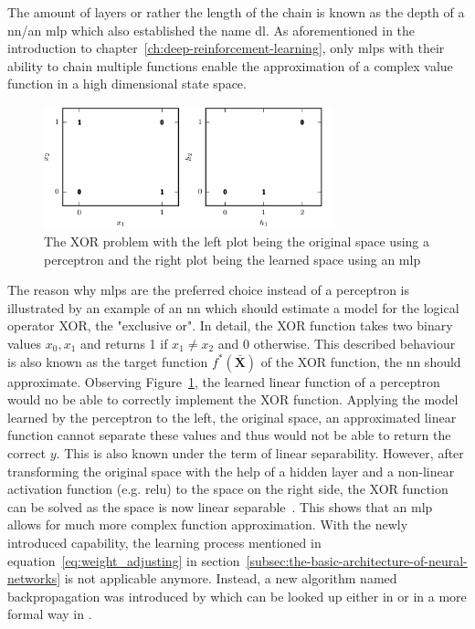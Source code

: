 \documentclass[draft,final]{vutinfth} %
\newcommand{\p}[1]{see p. #1}
\begin{document}
    The amount of layers or rather the length of the chain is known as the depth of a \gls{nn}/an \gls{mlp} which also established the name \acrlong{dl}.
    As aforementioned in the introduction to chapter~\ref{ch:deep-reinforcement-learning}, only \glspl{mlp} with their ability to chain multiple functions enable the approximation of a complex value function in a high dimensional state space.

    \begin{figure}[h]
        \vspace{0.5cm}
        \centering
        \includegraphics[width=0.75\textwidth]{figures/xor_problem.png}
        \caption[The XOR problem]{The XOR problem with the left plot being the original space using a perceptron and the right plot being the learned space using an \gls{mlp}\protect\footnotemark}
        \label{fig:xor_problem}
    \end{figure}

    \footnotetext{\cite[\p{168}]{goodfellow_deep_2016}}
    The reason why \glspl{mlp} are the preferred choice instead of a perceptron is illustrated by an example of an \gls{nn} which should estimate a model for the logical operator XOR, the "exclusive or".
    In detail, the XOR function takes two binary values $x_0,x_1$ and returns 1 if $x_1 \neq x_2$ and 0 otherwise.
    This described behaviour is also known as the target function $f^*(\bar{\boldsymbol{X}})$ of the XOR function, the \gls{nn} should approximate.
    Observing Figure~\ref{fig:xor_problem}, the learned linear function of a perceptron would no be able to correctly implement the XOR function.
    Applying the model learned by the perceptron to the left, the original space, an approximated linear function cannot separate these values and thus would not be able to return the correct $y$.
    This is also known under the term of linear separability.
    However, after transforming the original space with the help of a hidden layer and a non-linear activation function (e.g. \gls{relu}) to the space on the right side, the XOR function can be solved as the space is now linear separable~\citep[\p{166ff}; \p{32ff}]{goodfellow_deep_2016,aggarwal_neural_2018}.
    This shows that an \gls{mlp} allows for much more complex function approximation.
    With the newly introduced capability, the learning process mentioned in equation~\ref{eq:weight_adjusting} in section~\ref{subsec:the-basic-architecture-of-neural-networks} is not applicable anymore.
    Instead, a new algorithm named backpropagation was introduced by \citeauthor{rumelhart_learning_1986} which can be looked up either in \citet[\p{21}]{aggarwal_neural_2018} or in a more formal way in \citet[\p{197}]{goodfellow_deep_2016}.
\end{document}
